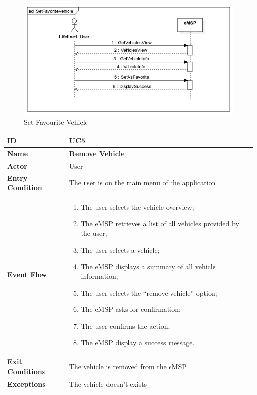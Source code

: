 \documentclass{Configuration_Files/PoliMi3i_thesis}
\begin{document}
\begin{figure}[H]
    \centering
    \includegraphics[width=1\textwidth]{Images/UseCases/SetFavouriteVehicle.jpg}
    \caption{Set Favourite Vehicle}
\end{figure}


\begin{table}[H]
    \begin{xltabular}{\textwidth}{| >{}l | X |}
    \hline
    \textbf{ID} & \textbf{UC5}\T\B\\
    \hline
    \textbf{Name} & \textbf{Remove Vehicle}\T\B\\
    \hline \hline
    \textbf{Actor} & User\T\B \\
    \hline
    \textbf{Entry Condition} & The user is on the main menu of the application\T\B\\
    \hline
    \textbf{Event Flow} & 
        \begin{enumerate}
        \item The user selects the vehicle overview;
        \item The eMSP retrieves a list of all vehicles provided by the user;
        \item The user selects a vehicle;
        \item The eMSP displays a summary of all vehicle information;
        \item The user selects the “remove vehicle” option;
        \item The eMSP asks for confirmation;
        \item The user confirms the action;
        \item The eMSP display a success message.
        \end{enumerate}\B\\
    \hline
    \textbf{Exit Conditions} & The vehicle is removed from the eMSP\B\\
    \hline
    \textbf{Exceptions} & The vehicle doesn't exists\B\\
    \hline
    \end{xltabular}
\end{table}
\end{document}
